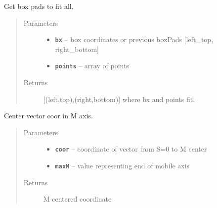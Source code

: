 \documentclass[letterpaper,10pt,english]{sphinxmanual}
\begin{document}
\begin{fulllineitems}
\label{RRtoolbox.lib.arrayops:RRtoolbox.lib.arrayops.basic.boxPads}
Get box pads to fit all.
\begin{quote}\begin{description}
\item[{Parameters}] \leavevmode\begin{itemize}
\item {} 
\textbf{\texttt{bx}} -- box coordinates or previous boxPads {[}left\_top, right\_bottom{]}

\item {} 
\textbf{\texttt{points}} -- array of points

\end{itemize}

\item[{Returns}] \leavevmode
{[}(left,top),(right,bottom){]} where bx and points fit.

\end{description}\end{quote}

\end{fulllineitems}


\begin{fulllineitems}
\label{RRtoolbox.lib.arrayops:RRtoolbox.lib.arrayops.basic.centerM}
Center vector coor in M axis.
\begin{quote}\begin{description}
\item[{Parameters}] \leavevmode\begin{itemize}
\item {} 
\textbf{\texttt{coor}} -- coordinate of vector from S=0 to M center

\item {} 
\textbf{\texttt{maxM}} -- value representing end of mobile axis

\end{itemize}

\item[{Returns}] \leavevmode
M centered coordinate

\end{description}\end{quote}

\end{fulllineitems}
\end{document}
